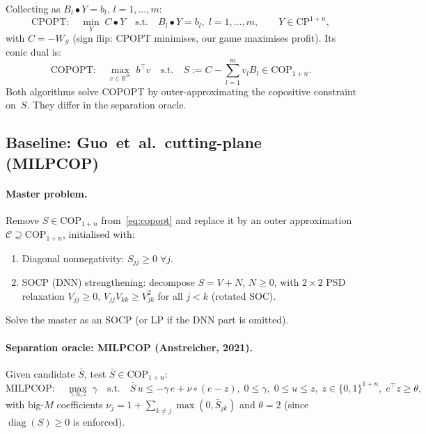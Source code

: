 \documentclass[11pt]{article}
\theoremstyle{definition}
\newcommand{\R}{\mathbb{R}}
\newcommand{\diag}{\operatorname{diag}}
\begin{document}
Collecting as $B_l\bullet Y=b_l$, $l=1,\dots,m$:
\begin{equation}
\boxed{
\mathrm{CPOPT}:\quad
\min_{Y}\;C\bullet Y
\quad\text{s.t.}\quad
B_l\bullet Y=b_l,\;l=1,\dots,m,\qquad
Y\in\mathrm{CP}^{1+n},}
\label{eq:cpopt}
\end{equation}
with $C=-W_S$ (sign flip: CPOPT minimises, our game maximises profit).
Its conic dual is:
\begin{equation}
\mathrm{COPOPT}:\quad
\max_{v\in\R^m}\;b^{\top}v
\quad\text{s.t.}\quad
S:=C-\textstyle\sum_{l=1}^{m}v_lB_l\in\mathrm{COP}_{1+n}.
\label{eq:copopt}
\end{equation}
Both algorithms solve COPOPT by outer-approximating the copositive
constraint on~$S$.  They differ in the separation oracle.

\subsection{Baseline: Guo~et~al.\ cutting-plane (MILPCOP)}
\label{sec:guo}

\paragraph{Master problem.}
Remove $S\in\mathrm{COP}_{1+n}$ from~\eqref{eq:copopt} and replace it
by an outer approximation $\mathcal{C}\supseteq\mathrm{COP}_{1+n}$,
initialised with:
\begin{enumerate}[leftmargin=1.6em]
\item Diagonal nonnegativity: $S_{jj}\ge0\;\forall j$.
\item SOCP (DNN) strengthening: decompose $S=V+N$, $N\ge0$, with
  $2\times2$ PSD relaxation $V_{jj}\ge0$,
  $V_{jj}V_{kk}\ge V_{jk}^{2}$ for all $j<k$ (rotated SOC).
\end{enumerate}
Solve the master as an SOCP (or LP if the DNN part is omitted).

\paragraph{Separation oracle: MILPCOP (Anstreicher, 2021).}
Given candidate $\bar S$, test $\bar S\in\mathrm{COP}_{1+n}$:
\begin{equation}
\mathrm{MILPCOP}:\quad
\max_{\gamma,u,z}\;\gamma
\quad\text{s.t.}\quad
\bar S\,u\le-\gamma\,e+\nu\circ(e-z),\;
0\le\gamma,\;
0\le u\le z,\;
z\in\{0,1\}^{1+n},\;
e^{\top}z\ge\theta,
\label{eq:milpcop-guo}
\end{equation}
with big-$M$ coefficients
$\nu_j=1+\sum_{k\neq j}\max(0,\bar S_{jk})$ and $\theta=2$ (since
$\diag(S)\ge0$ is enforced).
\end{document}
